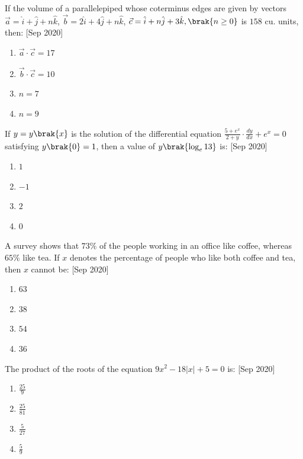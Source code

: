     \item If the volume of a parallelepiped whose coterminus edges are given by vectors $\vec{a} = \hat{i} + \hat{j} + n \hat{k}$, $\vec{b} = 2 \hat{i} + 4 \hat{j} + n \hat{k}$, $\vec{c} = \hat{i} + n \hat{j} + 3 \hat{k}, \brak{n \geq 0}$ is $158$ cu. units, then:
    \hfill{[Sep 2020]}
    \begin{enumerate}
        \item $\vec{a} \cdot \vec{c} = 17$
        \item $\vec{b} \cdot \vec{c} = 10$
        \item $n = 7$
        \item $n = 9$
    \end{enumerate}

    \item If $y = y\brak{x}$ is the solution of the differential equation $\frac{5 + e^x}{2+y} \cdot \frac{dy}{dx} + e^x = 0$ satisfying $y\brak{0} = 1$, then a value of $y\brak{\log_e 13}$ is:
    \hfill{[Sep 2020]}
    \begin{enumerate}
        \item $1$
        \item $-1$
        \item $2$
        \item $0$
    \end{enumerate}

    \item A survey shows that $73\%$ of the people working in an office like coffee, whereas $65\%$ like tea. If $x$ denotes the percentage of people who like both coffee and tea, then $x$ cannot be:
    \hfill{[Sep 2020]}
    \begin{enumerate}
        \item $63$
        \item $38$
        \item $54$
        \item $36$
    \end{enumerate}

    \item The product of the roots of the equation $9x^2 - 18|x| + 5 = 0$ is:
    \hfill{[Sep 2020]}
    \begin{enumerate}
        \item $\frac{25}{9}$
        \item $\frac{25}{81}$
        \item $\frac{5}{27}$
        \item $\frac{5}{9}$
    \end{enumerate}

